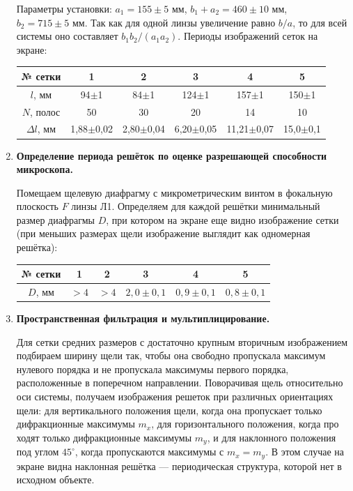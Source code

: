 \documentclass[a4paper,12pt]{article}
\begin{document}
\begin{enumerate}
		Параметры установки: $a_1 = 155\pm5$ мм, $b_1 + a_2 = 460\pm10$ мм, $b_2 = 715\pm5\text{ мм}$. Так
		как для одной линзы увеличение равно $b/a$, то для всей системы оно составляет $b_1b_2/(a_1a_2)$. Периоды изображений сеток на экране:
		\begin{center}
			\centering\begin{tabular}{|c|c|c|c|c|c|}
				\hline
				№ сетки & 1 & 2 & 3 & 4 & 5 \\ \hline
				$l$, мм & 94$\pm$1 & 84$\pm$1 & 124$\pm$1 & 157$\pm$1 & 150$\pm$1 \\ \hline
				$N$, полос & 50 & 30 & 20 & 14 & 10 \\ \hline
				$\Delta l$, мм & 1,88$\pm$0,02 & 2,80$\pm$0,04 & 6,20$\pm$0,05 & 11,21$\pm$0,07 & 15,0$\pm$0,1 \\ \hline
			\end{tabular}
		\end{center}
	
	\item \textbf{Определение периода решёток по оценке разрешающей способности
		микроскопа.}
		
		Помещаем щелевую диафрагму с микрометрическим винтом в фокальную плоскость $F$ линзы Л1. Определяем для каждой решётки минимальный размер диафрагмы $D$, при котором на экране еще видно изображение сетки (при меньших размерах щели изображение выглядит как одномерная решётка):
		\begin{center}
			\centering\begin{tabular}{|c|c|c|c|c|c|}
				\hline
				№ сетки & 1 & 2 & 3 & 4 & 5 \\ \hline
				$D$, мм & $>4$ & $>4$ & $2{,}0\pm0{,}1$ & $0{,}9\pm0{,}1$ & $0{,}8\pm0{,}1$ \\ \hline
			\end{tabular}
		\end{center}
		
	\item \textbf{Пространственная фильтрация и мультиплицирование.}
	
	Для сетки средних размеров с достаточно крупным вторичным изображением подбираем ширину щели так, чтобы она свободно пропускала максимум нулевого порядка и не пропускала максимумы первого порядка, расположенные в поперечном направлении. Поворачивая щель относительно оси системы, получаем изображения решеток при различных ориентациях щели: для вертикального положения щели, когда она пропускает только дифракционные максимумы $m_x$, для горизонтального положения, когда про ходят только дифракционные максимумы $m_y$, и для наклонного положения под углом $45^\circ$, когда пропускаются максимумы с $m_x = m_y$. В этом случае на экране видна наклонная решётка --- периодическая структура, которой нет в исходном объекте. 
	

\end{enumerate}
\end{document}
